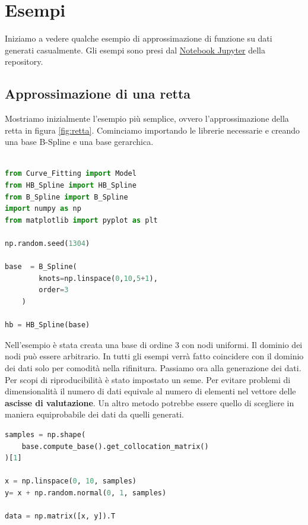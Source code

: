 \documentclass[../main.tex]{subfiles}
\begin{document}
\section{Esempi}
Iniziamo a vedere qualche esempio di approssimazione di funzione su dati generati casualmente.
Gli esempi sono presi dal \href{https://github.com/cMancio00/B-Spline/blob/main/esempi.ipynb}{Notebook Jupyter} della repository.
\subsection{Approssimazione di una retta}
Mostriamo inizialmente l'esempio più semplice, ovvero l'approssimazione della retta in figura \ref{fig:retta}. Cominciamo importando 
le librerie necessarie e creando una base B-Spline e una base gerarchica.

\begin{lstlisting}[language=Python, caption={Dichiarazione della base}]

from Curve_Fitting import Model
from HB_Spline import HB_Spline
from B_Spline import B_Spline
import numpy as np
from matplotlib import pyplot as plt

np.random.seed(1304)

base  = B_Spline(
        knots=np.linspace(0,10,5+1),
        order=3
    )

hb = HB_Spline(base)

\end{lstlisting}

Nell'esempio è stata creata una base di ordine 3 con nodi uniformi. Il dominio dei nodi può essere arbitrario. In tutti gli esempi verrà 
fatto coincidere con il dominio dei dati solo per comodità nella rifinitura.
Passiamo ora alla generazione dei dati. Per scopi di riproducibilità è stato impostato un seme. Per evitare problemi di dimensionalità 
il numero di dati equivale al numero di elementi nel vettore delle \textbf{ascisse di valutazione}. Un altro metodo potrebbe essere 
quello di scegliere in maniera equiprobabile dei dati da quelli generati. 

\begin{lstlisting}[language=Python, caption={Creazione e fit del modello}]
samples = np.shape(
    base.compute_base().get_collocation_matrix()
)[1]

x = np.linspace(0, 10, samples)
y= x + np.random.normal(0, 1, samples)

data = np.matrix([x, y]).T
\end{lstlisting} 
\end{document}
